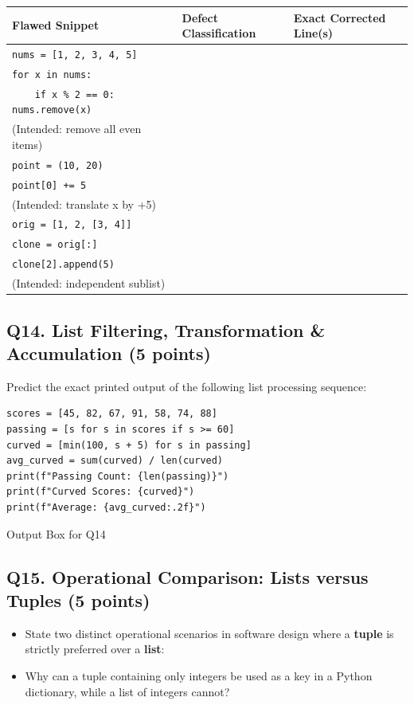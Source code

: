 \documentclass[11pt,a4paper]{article}
\begin{document}
\renewcommand{\arraystretch}{1.15}
\begin{tabularx}{\textwidth}{|X|p{4.2cm}|p{6.0cm}|}
\hline
\textbf{Flawed Snippet} & \textbf{Defect Classification} & \textbf{Exact Corrected Line(s)} \\
\hline
\texttt{nums = [1, 2, 3, 4, 5]}\\
\texttt{for x in nums:}\\
\texttt{\ \ \ \ if x \% 2 == 0: nums.remove(x)}\\
(Intended: remove all even items) & & \\[3.2mm]
\hline
\texttt{point = (10, 20)}\\
\texttt{point[0] += 5}\\
(Intended: translate x by +5) & & \\[3.2mm]
\hline
\texttt{orig = [1, 2, [3, 4]]}\\
\texttt{clone = orig[:]}\\
\texttt{clone[2].append(5)}\\
(Intended: independent sublist) & & \\[3.2mm]
\hline
\end{tabularx}

\vspace{1mm}
\subsection*{Q14. List Filtering, Transformation \& Accumulation (5 points)}
Predict the exact printed output of the following list processing sequence:

\begin{lstlisting}
scores = [45, 82, 67, 91, 58, 74, 88]
passing = [s for s in scores if s >= 60]
curved = [min(100, s + 5) for s in passing]
avg_curved = sum(curved) / len(curved)
print(f"Passing Count: {len(passing)}")
print(f"Curved Scores: {curved}")
print(f"Average: {avg_curved:.2f}")
\end{lstlisting}

\begin{answerbox}[height=2.2cm]{Output Box for Q14}
\end{answerbox}

\vspace{1mm}
\subsection*{Q15. Operational Comparison: Lists versus Tuples (5 points)}
\begin{itemize}[leftmargin=2em]
  \item State two distinct operational scenarios in software design where a \textbf{tuple} is strictly preferred over a \textbf{list}: \hrulefill
  \item Why can a tuple containing only integers be used as a key in a Python dictionary, while a list of integers cannot? \hrulefill
\end{itemize}
\end{document}
